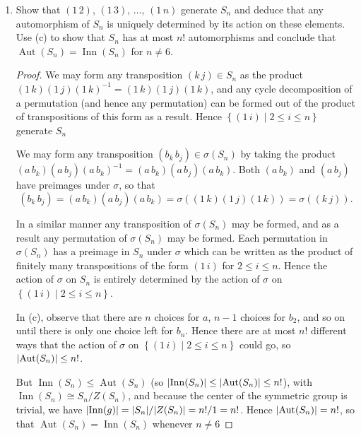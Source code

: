 \documentclass[11pt]{article}
\newcommand{\cbr}[1]{\left\{#1\right\}}
\DeclareMathOperator\Aut{Aut}
\DeclareMathOperator\Inn{Inn}
\begin{document}
\begin{enumerate}
\begin{enumerate}[label=(\alph*)]
\begin{proof}
        So without loss of generality we have $x = a$ and $b_{k+1}\neq b_i$ for $2\leq i \leq k$. Hence by induction the sequence of mappings \[\sigma\colon (1\, 2)\mapsto (a\, b_2), \quad\sigma\colon (1\, 3)\mapsto (a\, b_3), \quad\dots,\quad \sigma\colon (1\, n)\mapsto (a\, b_n)\]
        for any $\sigma\in \Aut(S_n)$ can be formed for some distinct integers $a, b_2, b_3, \dots, b_n\in \cbr{1, 2, \dots, n}$.
      \end{proof}
      \item Show that $(1\, 2), \, (1\, 3), \, \dots,\, (1\, n)$ generate $S_n$ and deduce that any automorphism of $S_n$ is uniquely determined by its action on these elements. Use (c) to show that $S_n$ has at most $n!$ automorphisms and conclude that $\Aut(S_n) = \Inn(S_n)$ for $n\neq 6$.
      \begin{proof}
        We may form any transposition $(k\, j)\in S_n$ as the product $(1\,k)(1\,j)(1\,k)^{-1} = (1\,k)(1\,j)(1\,k)$, and any cycle decomposition of a permutation (and hence any permutation) can be formed out of the product of transpositions of this form as a result. Hence $\cbr{(1\,i)\mid2\leq i \leq n}$ generate $S_n$

        We may form any transposition $(b_k\, b_j)\in \sigma(S_n)$ by taking the product $(a\, b_k)(a\, b_j)(a\, b_k)^{-1} = (a\, b_k)(a\, b_j)(a\, b_k)$. Both $(a\, b_k)$ and $(a\, b_j)$ have preimages under $\sigma$, so that \[(b_k\, b_j) = (a\, b_k)(a\, b_j)(a\, b_k) = \sigma((1\,k)(1\,j)(1\,k)) = \sigma((k\, j)).\]

        In a similar manner any transposition of $\sigma(S_n)$ may be formed, and as a result any permutation of $\sigma(S_n)$ may be formed. Each permutation in $\sigma(S_n)$ has a preimage in $S_n$ under $\sigma$ which can be written as the product of finitely many transpositions of the form $(1\, i)$ for $2\leq i\leq n$. Hence the action of $\sigma$ on $S_n$ is entirely determined by the action of $\sigma$ on $\cbr{(1\,i)\mid2\leq i \leq n}$.

        In (c), observe that there are $n$ choices for $a$, $n-1$ choices for $b_2$, and so on until there is only one choice left for $b_n$. Hence there are at most $n!$ different ways that the action of $\sigma$ on $\cbr{(1\,i)\mid2\leq i \leq n}$ could go, so $\abs{\Aut(S_n)} \leq n!$. 

        But $\Inn(S_n)\leq \Aut(S_n)$ (so $\abs{\Inn(S_n)}\leq \abs{\Aut(S_n)} \leq n!$), with $\Inn(S_n) \cong S_n/Z(S_n)$, and because the center of the symmetric group is trivial, we have $\abs{\Inn(g)} = \abs{S_n}/\abs{Z(S_n)} = n!/1 = n!$. Hence $\abs{\Aut(S_n)} = n!$, so that $\Aut(S_n) = \Inn(S_n)$ whenever $n\neq 6$
      \end{proof}
    \end{enumerate}
\end{enumerate}
\end{document}
